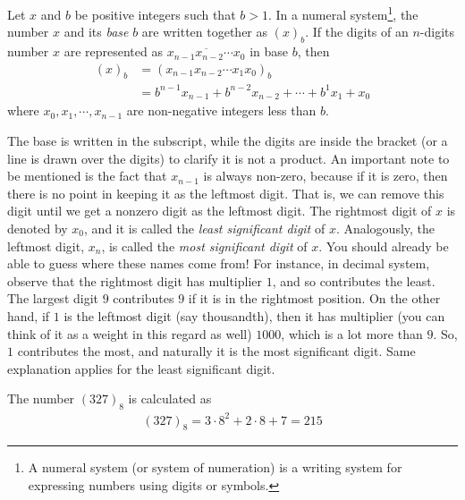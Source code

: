 \documentclass{subfile}
\begin{document}
	\begin{definition}\label{def:base}
		Let $x$ and $b$ be positive integers such that $b>1$. In a numeral system\footnote{A numeral system (or system of numeration) is a writing system for expressing numbers using digits or symbols.}, the number $x$ and its \textit{base} $b$ are written together as $(x)_b$. If the digits of an $n$-digits number $x$ are represented as $\overline{x_{n-1}x_{n-2}\cdots x_0}$ in base $b$, then
		\begin{align*}
			(x)_b
				& = (x_{n-1}x_{n-2}\cdots x_1x_0)_b\\
				& =b^{n-1} x_{n-1} + b^{n-2} x_{n-2} + \cdots + b^1x_1 + x_0
		\end{align*}
		where $x_0, x_1, \cdots, x_{n-1}$ are non-negative integers less than $b$.
	\end{definition}

	The base is written in the subscript, while the digits are inside the bracket (or a line is drawn over the digits) to clarify it is not a product. An important note to be mentioned is the fact that $x_{n-1}$ is always non-zero, because if it is zero, then there is no point in keeping it as the leftmost digit. That is, we can remove this digit until we get a nonzero digit as the leftmost digit. The rightmost digit of $x$ is denoted by $x_0$, and it is called the \textit{least significant digit} of $x$. Analogously, the leftmost digit, $x_n$, is called the \textit{most significant digit} of $x$. You should already be able to guess where these names come from! For instance, in decimal system, observe that the rightmost digit has multiplier $1$, and so contributes the least. The largest digit $9$ contributes $9$ if it is in the rightmost position. On the other hand, if $1$ is the leftmost digit (say thousandth), then it has multiplier (you can think of it as a weight in this regard as well) $1000$, which is a lot more than $9$. So, $1$ contributes the most, and naturally it is the most significant digit. Same explanation applies for the least significant digit.
	\begin{example}
		The number $(327)_8$ is calculated as
		\begin{align*}
			(327)_8 = 3 \cdot 8^2 + 2 \cdot 8 + 7 = 215
		\end{align*}
	\end{example}
\end{document}

